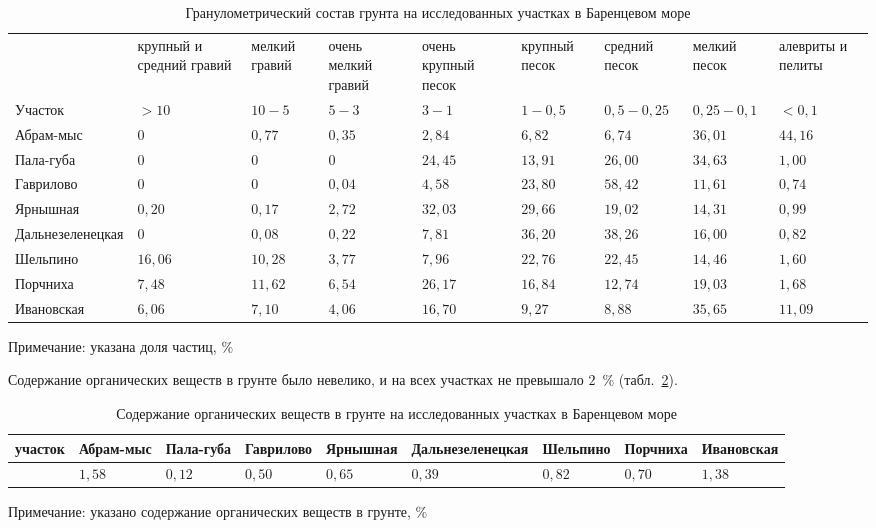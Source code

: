     \begin{table}[p]
    \caption{Гранулометрический состав грунта на исследованных участках в Баренцевом море}
    \label{tab:grunt_granulometriya_Barents}
    \begin{tabularx}{\textwidth}{|p{}|*{8}{X|}} \hline
    & круп\-ный и сред\-ний гравий  &  мел\-кий гра\-вий &  очень мел\-кий гра\-вий & очень круп\-ный песок & круп\-ный песок &  сред\-ний песок & мел\-кий песок & алеври\-ты и пели\-ты \\
        Участок &   $>10$ &  $10-5$ &   $5-3$ &  $3-1$ & $1-0,5$ &   $0,5-0,25$ &    $0,25-0,1$ &    $<0,1$
        \\ \hline
    Абрам-мыс &  $0$ &  $0,77$ &  $0,35$ &  $2,84$ &  $6,82$ &  $6,74$ & $36,01$ &  $44,16$
        \\ \hline
        Пала-губа  &  $0$ &  $0$ &  $0$ &  $24,45$ &  $13,91$ &  $26,00$ &  $34,63$ &  $1,00$
        \\ \hline
        Гаврилово &  $0$ &  $0$ &  $0,04$ &   $4,58$ &   $23,80$ &  $58,42$ &  $11,61$ &  $0,74$
        \\ \hline
        Ярнышная  &  $0,20$ &  $0,17$  &  $2,72$ &  $32,03$ &  $29,66$ &  $19,02$ &  $14,31$  &  $0,99$
        \\ \hline
        Даль\-не\-зе\-ле\-нец\-кая &  $0$ &  $0,08$ &    $0,22$ &    $7,81$ &    $36,20$ &  $38,26$ &   $16,00$ &   $0,82$
        \\ \hline
    Шельпино  &  $16,06$ &   $10,28$ &   $3,77$ &  $7,96$  &  $22,76$ &  $22,45$ &    $14,46$ &  $1,60$ 
        \\ \hline
    Порчниха  &  $7,48$ &   $11,62$ &  $6,54$ &   $26,17$ &  $16,84$ &  $12,74$ &  $19,03$ &  $1,68$ 
        \\ \hline
    Ивановская &  $6,06$ &    $7,10$ &   $4,06$ &   $16,70$ &  $9,27$ &   $8,88$ &   $35,65$ &  $11,09$
        \\ \hline
    \end{tabularx}

    {\footnotesize Примечание: указана доля частиц, \%}
    \end{table}


Содержание   органических   веществ   в   грунте   было   невелико,   и   на   всех   участках   не превышало $2$~\% (табл.~\ref{tab:grunt_orgaika_Barents}).
    \begin{table}[p]
    \caption{Содержание органических веществ в грунте на исследованных участках в Баренцевом море}
    \label{tab:grunt_orgaika_Barents}
    \begin{tabularx}{\textwidth}{|*{9}{X|}} \hline
    участок & Абрам-мыс &   Пала-губа &  Гав\-ри\-ло\-во  & Яр\-ныш\-ная &   Даль\-не\-зе\-ле\-нец\-кая &  Шель\-пи\-но &   Порч\-ни\-ха &   Ива\-нов\-ская
        \\ \hline
     &  $1,58$ &    $0,12$ &   $0,50$ &   $0,65$ &   $0,39$ &   $0,82$ &   $0,70$ & $1,38$
        \\ \hline
    \end{tabularx}

    {\footnotesize Примечание: указано содержание органических веществ в грунте, \%}
    \end{table}


